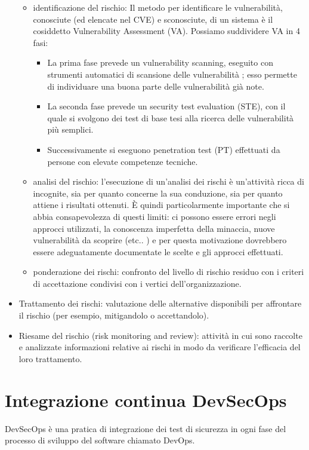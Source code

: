 \begin{itemize}
        \begin{itemize}
            \item identificazione del rischio: Il metodo per identificare le vulnerabilità, conosciute (ed elencate nel CVE) e sconosciute, di un sistema è il cosiddetto Vulnerability Assessment (VA).  Possiamo suddividere VA in 4 fasi:
                \begin{itemize}
                    \item La prima fase prevede un vulnerability scanning, eseguito con strumenti automatici di scansione delle vulnerabilità ; esso permette di individuare una buona parte delle vulnerabilità già note.
                    \item La seconda fase prevede un security test evaluation (STE), con il quale si svolgono dei test di base tesi alla ricerca delle vulnerabilità più semplici.
                    \item Successivamente si eseguono penetration test (PT) effettuati da persone con elevate competenze tecniche.
                \end{itemize}
            \item analisi del rischio:  l’esecuzione di un’analisi dei rischi è un’attività ricca di incognite, sia per quanto concerne la sua conduzione, sia per quanto attiene i risultati ottenuti. È quindi particolarmente importante che si abbia consapevolezza di questi limiti: ci possono essere errori negli approcci utilizzati, la conoscenza imperfetta della minaccia, nuove vulnerabilità da scoprire (etc.. ) e per questa motivazione dovrebbero essere adeguatamente documentate le scelte e gli approcci effettuati.
            \item ponderazione dei rischi: confronto del livello di rischio residuo con i criteri di accettazione condivisi con i vertici dell’organizzazione.
        \end{itemize}
    \item Trattamento dei rischi: valutazione delle alternative disponibili per affrontare il rischio (per esempio, mitigandolo o accettandolo).
    \item Riesame del rischio (risk monitoring and review):  attività in cui sono raccolte e analizzate informazioni relative ai rischi in modo da verificare l’efficacia del loro trattamento. 
\end{itemize}
\section{Integrazione continua DevSecOps}
\cite{DevSecOps}
\cite{DevSecOps2}
DevSecOps è una pratica di integrazione dei test di sicurezza in ogni fase del processo di sviluppo del software chiamato DevOps. 

